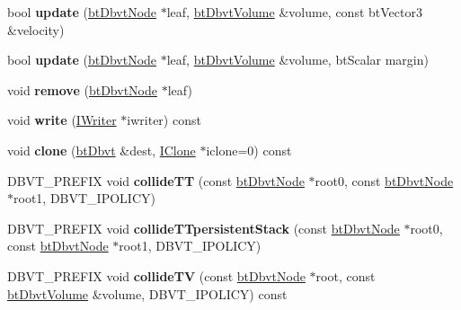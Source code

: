 \begin{DoxyCompactItemize}
\item 
\hypertarget{structbt_dbvt_ac4ec3a1dec7bc12e0803159a6d53e4b3}{bool {\bfseries update} (\hyperlink{structbt_dbvt_node}{bt\+Dbvt\+Node} $\ast$leaf, \hyperlink{structbt_dbvt_aabb_mm}{bt\+Dbvt\+Volume} \&volume, const bt\+Vector3 \&velocity)}\label{structbt_dbvt_ac4ec3a1dec7bc12e0803159a6d53e4b3}

\item 
\hypertarget{structbt_dbvt_a0f6e436b7a7dd41d1ea1b732b26f0a5c}{bool {\bfseries update} (\hyperlink{structbt_dbvt_node}{bt\+Dbvt\+Node} $\ast$leaf, \hyperlink{structbt_dbvt_aabb_mm}{bt\+Dbvt\+Volume} \&volume, bt\+Scalar margin)}\label{structbt_dbvt_a0f6e436b7a7dd41d1ea1b732b26f0a5c}

\item 
\hypertarget{structbt_dbvt_ae01b804da6734f4ce250f6fe7ef0b5fb}{void {\bfseries remove} (\hyperlink{structbt_dbvt_node}{bt\+Dbvt\+Node} $\ast$leaf)}\label{structbt_dbvt_ae01b804da6734f4ce250f6fe7ef0b5fb}

\item 
\hypertarget{structbt_dbvt_a84c55460accf7b4a4bf9fd3b76887b17}{void {\bfseries write} (\hyperlink{structbt_dbvt_1_1_i_writer}{I\+Writer} $\ast$iwriter) const }\label{structbt_dbvt_a84c55460accf7b4a4bf9fd3b76887b17}

\item 
\hypertarget{structbt_dbvt_adaad3e37b372bcf57584d4957ab81c6b}{void {\bfseries clone} (\hyperlink{structbt_dbvt}{bt\+Dbvt} \&dest, \hyperlink{structbt_dbvt_1_1_i_clone}{I\+Clone} $\ast$iclone=0) const }\label{structbt_dbvt_adaad3e37b372bcf57584d4957ab81c6b}

\item 
\hypertarget{structbt_dbvt_aeb3be68be0d863b1534996676a2aa416}{D\+B\+V\+T\+\_\+\+P\+R\+E\+F\+I\+X void {\bfseries collide\+T\+T} (const \hyperlink{structbt_dbvt_node}{bt\+Dbvt\+Node} $\ast$root0, const \hyperlink{structbt_dbvt_node}{bt\+Dbvt\+Node} $\ast$root1, D\+B\+V\+T\+\_\+\+I\+P\+O\+L\+I\+C\+Y)}\label{structbt_dbvt_aeb3be68be0d863b1534996676a2aa416}

\item 
\hypertarget{structbt_dbvt_ad42b74ec72d83f4de65e1e78ad5bc012}{D\+B\+V\+T\+\_\+\+P\+R\+E\+F\+I\+X void {\bfseries collide\+T\+Tpersistent\+Stack} (const \hyperlink{structbt_dbvt_node}{bt\+Dbvt\+Node} $\ast$root0, const \hyperlink{structbt_dbvt_node}{bt\+Dbvt\+Node} $\ast$root1, D\+B\+V\+T\+\_\+\+I\+P\+O\+L\+I\+C\+Y)}\label{structbt_dbvt_ad42b74ec72d83f4de65e1e78ad5bc012}

\item 
\hypertarget{structbt_dbvt_a222e4c7a13c6202e971a8a30c45d0943}{D\+B\+V\+T\+\_\+\+P\+R\+E\+F\+I\+X void {\bfseries collide\+T\+V} (const \hyperlink{structbt_dbvt_node}{bt\+Dbvt\+Node} $\ast$root, const \hyperlink{structbt_dbvt_aabb_mm}{bt\+Dbvt\+Volume} \&volume, D\+B\+V\+T\+\_\+\+I\+P\+O\+L\+I\+C\+Y) const }\label{structbt_dbvt_a222e4c7a13c6202e971a8a30c45d0943}


\end{DoxyCompactItemize}
